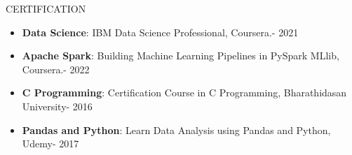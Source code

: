 \documentclass{resume} %
\begin{document}
\begin{rSection}{ CERTIFICATION}
\begin{itemize}
\itemsep -3pt {} 
\item \textbf{Data Science}: IBM Data Science Professional, Coursera.- 2021 
\item \textbf{Apache Spark}: Building Machine Learning Pipelines in PySpark MLlib, Coursera.- 2022 
\item \textbf{C Programming}:  Certification Course in C Programming, Bharathidasan University- 2016 
\item \textbf{Pandas and Python}:  Learn Data Analysis using Pandas and Python, Udemy- 2017
 \end{itemize}
\end{rSection}
\end{document}
